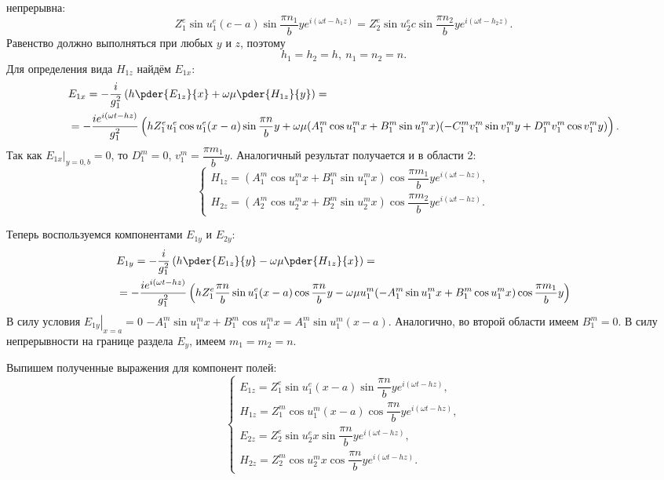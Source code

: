 \documentclass[a4paper]{article}
\renewcommand{\frac}{\dfrac}
\begin{document}
непрерывна:
    \[
        Z^e_1\sin u^e_1 (c-a) \sin \frac{\pi n_1}{b}y
        e^{i(\omega t - h_1 z)} =
        Z^e_2\sin u^e_2 c \sin \frac{\pi n_2}{b}y
        e^{i(\omega t - h_2 z)}.
    \]
Равенство должно выполняться при любых \( y \) и \( z \), поэтому
\[
    \boxed{h_1 = h_2 = h,\ n_1 = n_2 = n.}
\]
Для определения вида \( H_{1z} \) найдём \( E_{1x} \):
\begin{align*}
    & E_{1x} =
    -\frac{i}{g_1^2}\left( h\pder{E_{1z}}{x} + \omega\mu\pder{H_{1z}}{y} \right)
    =\\
    & = -\frac{ie^{i(\omega t - h z)}}{g_1^2}
    \left( h Z^e_1 u^e_1 \cos u^e_1(x-a)\sin\frac{\pi n}{b}y +
    \omega\mu(A^m_1\cos u^m_1 x + B^m_1\sin u^m_1 x)
    (-C^m_1 v^m_1 \sin v^m_1 y + D^m_1 v^m_1 \cos v^m_1 y)\right).
\end{align*}
Так как \( \left.E_{1x}\right|_{y=0,b} = 0 \), то \( D^m_1 = 0 \),
\( v^m_1 = \frac{\pi m_1}{b} y \). Аналогичный результат получается и в области
2:
\[
    \left\{
    \begin{array}{l}
        H_{1z} =
        (A^m_1\cos u^m_1 x + B^m_1\sin u^m_1 x)\cos\frac{\pi m_1}{b}y
        e^{i(\omega t - h z)}, \\
        H_{2z} =
        (A^m_2\cos u^m_2 x + B^m_2\sin u^m_2 x)\cos\frac{\pi m_2}{b}y
        e^{i(\omega t - h z)}.
    \end{array}
    \right.
\]

Теперь воспользуемся компонентами \( E_{1y} \) и \( E_{2y} \):
\begin{align*}
    & E_{1y} = -\frac{i}{g_1^2}\left( h\pder{E_{1z}}{y} -
    \omega\mu\pder{H_{1z}}{x} \right) = \\
    & = -\frac{ie^{i(\omega t - hz)}}{g_1^2}\left( h Z^e_1 \frac{\pi n}{b}
    \sin u^e_1(x-a)\cos\frac{\pi n}{b}y - \omega\mu
    u^m_1 (-A^m_1 \sin u^m_1 x + B^m_1\cos u^m_1 x)\cos\frac{\pi m_1}{b}y
   \right)
\end{align*}
В силу условия \( \left.E_{1y}\right|_{x=a} = 0 \)
\( -A^m_1 \sin u^m_1 x + B^m_1\cos u^m_1 x = A^m_1\sin u^m_1(x-a) \).
Аналогично, во второй области имеем \(B^m_1=0 \). В силу непрерывности на
границе раздела \( E_y \), имеем \( m_1 = m_2 = n \).

Выпишем полученные выражения для компонент полей:
\[
    \left\{
    \begin{array}{l}
        E_{1z} = Z^e_1\sin u^e_1 (x-a) \sin \frac{\pi n}{b}y
        e^{i(\omega t - h z)},\\
        H_{1z} = Z^m_1\cos u^m_1 (x-a) \cos \frac{\pi n}{b}y
        e^{i(\omega t - h z)},\\
        E_{2z} = Z^e_2\sin u^e_2 x \sin \frac{\pi n}{b}y
        e^{i(\omega t - h z)},\\
        H_{2z} = Z^m_2\cos u^m_2 x \cos \frac{\pi n}{b}y
        e^{i(\omega t - h z)}.
    \end{array}
    \right.
\]
\end{document}
